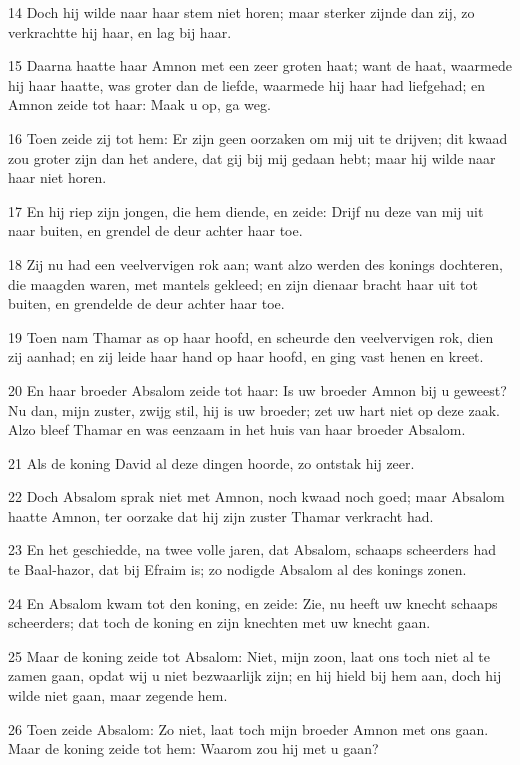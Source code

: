 \par 14 Doch hij wilde naar haar stem niet horen; maar sterker zijnde dan zij, zo verkrachtte hij haar, en lag bij haar.
\par 15 Daarna haatte haar Amnon met een zeer groten haat; want de haat, waarmede hij haar haatte, was groter dan de liefde, waarmede hij haar had liefgehad; en Amnon zeide tot haar: Maak u op, ga weg.
\par 16 Toen zeide zij tot hem: Er zijn geen oorzaken om mij uit te drijven; dit kwaad zou groter zijn dan het andere, dat gij bij mij gedaan hebt; maar hij wilde naar haar niet horen.
\par 17 En hij riep zijn jongen, die hem diende, en zeide: Drijf nu deze van mij uit naar buiten, en grendel de deur achter haar toe.
\par 18 Zij nu had een veelvervigen rok aan; want alzo werden des konings dochteren, die maagden waren, met mantels gekleed; en zijn dienaar bracht haar uit tot buiten, en grendelde de deur achter haar toe.
\par 19 Toen nam Thamar as op haar hoofd, en scheurde den veelvervigen rok, dien zij aanhad; en zij leide haar hand op haar hoofd, en ging vast henen en kreet.
\par 20 En haar broeder Absalom zeide tot haar: Is uw broeder Amnon bij u geweest? Nu dan, mijn zuster, zwijg stil, hij is uw broeder; zet uw hart niet op deze zaak. Alzo bleef Thamar en was eenzaam in het huis van haar broeder Absalom.
\par 21 Als de koning David al deze dingen hoorde, zo ontstak hij zeer.
\par 22 Doch Absalom sprak niet met Amnon, noch kwaad noch goed; maar Absalom haatte Amnon, ter oorzake dat hij zijn zuster Thamar verkracht had.
\par 23 En het geschiedde, na twee volle jaren, dat Absalom, schaaps scheerders had te Baal-hazor, dat bij Efraim is; zo nodigde Absalom al des konings zonen.
\par 24 En Absalom kwam tot den koning, en zeide: Zie, nu heeft uw knecht schaaps scheerders; dat toch de koning en zijn knechten met uw knecht gaan.
\par 25 Maar de koning zeide tot Absalom: Niet, mijn zoon, laat ons toch niet al te zamen gaan, opdat wij u niet bezwaarlijk zijn; en hij hield bij hem aan, doch hij wilde niet gaan, maar zegende hem.
\par 26 Toen zeide Absalom: Zo niet, laat toch mijn broeder Amnon met ons gaan. Maar de koning zeide tot hem: Waarom zou hij met u gaan?
